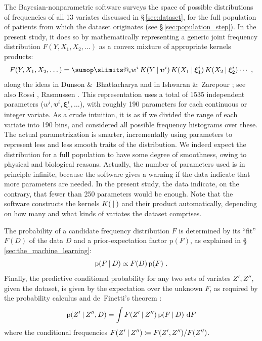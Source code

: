 \documentclass[a4paper,12pt,%
onecolumn,oneside,article,%
british%
]{memoir}
\makeatletter
\theoremstyle{remark}
\theoremstyle{innote}
\def\sum{\DOTSI\sumop\slimits@}
\newcommand*{\citey}{\cites*}
\newcommand*{\amp}{\&}
\newcommand*{\di}{\mathop{}\!\mathrm{d}}%
\newcommand*{\defd}{\coloneqq}
\newcommand*{\p}{\mathrm{p}}%
\renewcommand*{\|}[1][]{\nonscript\:#1\vert\nonscript\:\mathopen{}}
\newcommand*{\sect}{\S}%
\makeatother
\begin{document}
The Bayesian-nonparametric software surveys the space of possible distributions of frequencies of all 13 variates discussed in \sect\,\ref{sec:dataset}, for the full population of patients from which the dataset originates (see \sect\,\ref{sec:population_step}). In the present study, it does so by mathematically representing a generic joint frequency distribution $F(Y,X_1,X_2,\dotsc)$ as a convex mixture of appropriate kernels products:
\begin{equation*}
F(Y,X_1,X_2,\dotsc) = \sum_i w^{i}\, K(Y\|\bm{\upsilon}^{i})\,
K(X_1\|\bm{\xi}_1^{i})\, K(X_2\|\bm{\xi}_2^{i})\dotsm\ ,
\end{equation*}
along the ideas in Dunson \amp\ Bhattacharya \citey{dunsonetal2011} and in Ishwaran \amp\ Zarepour \citey{ishwaranetal2002b}; see also Rossi \citey{rossi2014}, Rasmussen \citey{rasmussen1999}. This representation uses a total of 1535 independent parameters ($w^{i}, \bm{\upsilon}^{i}, \bm{\xi}^{i}_{1}, \dotsc$), with roughly 190 parameters for each continuous or integer variate. As a crude intuition, it is as if we divided the range of each variate into 190 bins, and considered all possible frequency histograms over these. The actual parametrization is smarter, incrementally using parameters to represent less and less smooth traits of the distribution. We indeed expect the distribution for a full population to have some degree of smoothness, owing to physical and biological reasons. Actually, the number of parameters used is in principle infinite, because the software gives a warning if the data indicate that more parameters are needed. In the present study, the data indicate, on the contrary, that fewer than 250 parameters would be enough. Note that the software constructs the kernels $K(\|)$ and their product automatically, depending on how many and what kinds of variates the dataset comprises.

The probability of a candidate frequency distribution $F$ is determined by its \enquote{fit} $F(D)$ of the data $D$ and a prior-expectation factor $\p(F)$, as explained in \sect\,\ref{sec:the_machine_learning}:
\begin{equation*}
  \p(F\| D) \propto F(D)\, \p(F) \ .
\end{equation*}
Finally, the predictive conditional probability for any two sets of variates $Z',Z''$, given the dataset, is given by the expectation over the unknown $F$, as required by the probability calculus and de~Finetti's theorem \autocites[\sect\,4.6]{bernardoetal1994_r2000}:
\begin{equation*}
  \p(Z' \| Z'', D) = \int F(Z' \| Z'')\, \p(F\|D)\, \di F
\end{equation*}
where the conditional frequencies $F(Z'\|Z'') \defd F(Z',Z'')/F(Z'')$.
\end{document}
